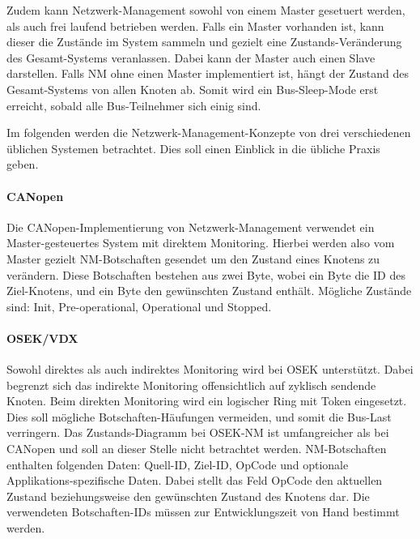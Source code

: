 \documentclass[
  a4paper,					    %
  twoside,
  DIV=calc,     				%
  bibliography=totoc,
  cleardoublepage=empty,
  ngerman,     					%
  final       					%
]{scrbook}
\begin{document}
Zudem kann Netzwerk-Management sowohl von einem Master gesetuert werden, als auch frei laufend betrieben werden. Falls ein Master vorhanden ist, kann dieser die Zustände im System sammeln und gezielt eine Zustands-Veränderung des Gesamt-Systems veranlassen. Dabei kann der Master auch einen Slave darstellen. Falls NM ohne einen Master implementiert ist, hängt der Zustand des Gesamt-Systems von allen Knoten ab. Somit wird ein Bus-Sleep-Mode erst erreicht, sobald alle Bus-Teilnehmer sich einig sind.

Im folgenden werden die Netzwerk-Management-Konzepte von drei verschiedenen üblichen Systemen betrachtet. Dies soll einen Einblick in die übliche Praxis geben.

\paragraph{CANopen}
Die CANopen-Implementierung von Netzwerk-Management verwendet ein Master-gesteuertes System mit direktem Monitoring. Hierbei werden also vom Master gezielt NM-Botschaften gesendet um den Zustand eines Knotens zu verändern. Diese Botschaften bestehen aus zwei Byte, wobei ein Byte die ID des Ziel-Knotens, und ein Byte den gewünschten Zustand enthält. Mögliche Zustände sind: Init, Pre-operational, Operational und Stopped.

\paragraph{OSEK/VDX}
Sowohl direktes als auch indirektes Monitoring wird bei OSEK unterstützt. Dabei begrenzt sich das indirekte Monitoring offensichtlich auf zyklisch sendende Knoten. Beim direkten Monitoring wird ein logischer Ring mit Token eingesetzt. Dies soll mögliche Botschaften-Häufungen vermeiden, und somit die Bus-Last verringern. Das Zustands-Diagramm bei OSEK-NM ist umfangreicher als bei CANopen und soll an dieser Stelle nicht betrachtet werden. NM-Botschaften enthalten folgenden Daten: Quell-ID, Ziel-ID, OpCode und optionale Applikations-spezifische Daten. Dabei stellt das Feld OpCode den aktuellen Zustand beziehungsweise den gewünschten Zustand des Knotens dar. Die verwendeten Botschaften-IDs müssen zur Entwicklungszeit von Hand bestimmt werden.
\end{document}
